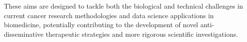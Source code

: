 These aims are designed to tackle both the biological and technical challenges
in current cancer research methodologies and data science applications in
biomedicine, potentially contributing to the development of novel
anti-disseminative therapeutic strategies and more rigorous scientific
investigations.